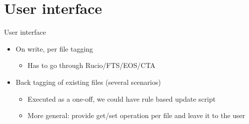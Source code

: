 \documentclass[aspectratio=149]{beamer}
\begin{document}
\section{User interface}
\begin{frame}{User interface}
\begin{itemize}
  \item On write, per file tagging
  \begin{itemize}
    \item Has to go through Rucio/FTS/EOS/CTA
  \end{itemize}
  \item Back tagging of existing files (several scenarios)
  \begin{itemize}
    \item Executed as a one-off, we could have rule based update script
    \item More general: provide get/set operation per file and leave it to the user
  \end{itemize}
\end{itemize}
\end{frame}
\end{document}
